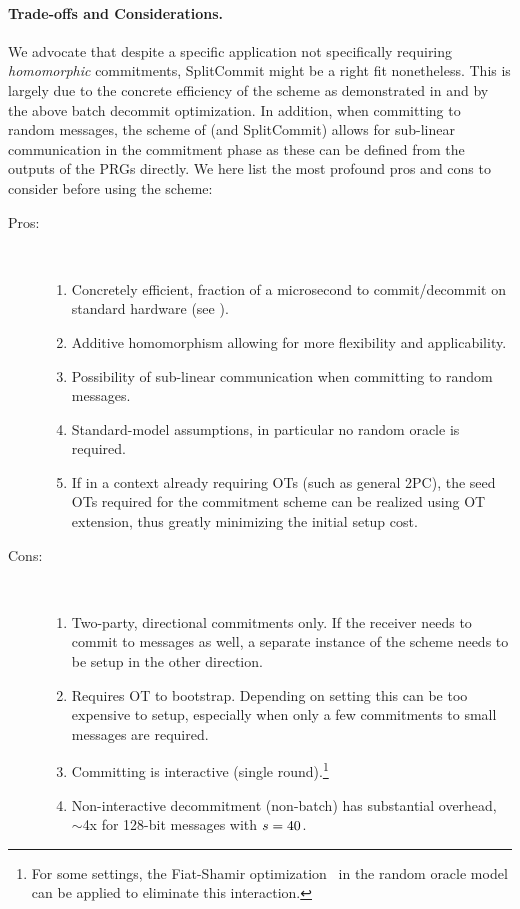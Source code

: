 \paragraph{Trade-offs and Considerations.}
We advocate that despite a specific application not specifically requiring \textit{homomorphic} commitments, SplitCommit might be a right fit nonetheless. This is largely due to the concrete efficiency of the scheme as demonstrated in  and by the above batch decommit optimization. In addition, when committing to random messages, the scheme of \cite{DBLP:conf/tcc/FrederiksenJNT16} (and SplitCommit) allows for sub-linear communication in the commitment phase as these can be defined from the outputs of the PRGs directly. We here list the most profound pros and cons to consider before using the scheme:
\begin{description}
  \item[Pros:]
  ~
  \begin{enumerate}
     \item Concretely efficient, fraction of a microsecond to commit/decommit on standard hardware (see ).
     \item Additive homomorphism allowing for more flexibility and applicability.
     \item Possibility of sub-linear communication when committing to random messages.
     \item Standard-model assumptions, in particular no random oracle is required.
     \item If in a context already requiring OTs (such as general 2PC), the seed OTs required for the commitment scheme can be realized using OT extension, thus greatly minimizing the initial setup cost.
   \end{enumerate}
   \item[Cons:]
   ~
   \begin{enumerate}
     \item Two-party, directional commitments only. If the receiver needs to commit to messages as well, a separate instance of the scheme needs to be setup in the other direction.
     \item Requires OT to bootstrap. Depending on setting this can be too expensive to setup, especially when only a few commitments to small messages are required.
     \item Committing is interactive (single round).\footnote{For some settings, the Fiat-Shamir optimization~\cite{DBLP:conf/crypto/FiatS86} in the random oracle model can be applied to eliminate this interaction.}
     \item Non-interactive decommitment (non-batch) has substantial overhead, $\sim$4x for 128-bit messages with $s=40$.\samefootnote
   \end{enumerate}
\end{description}

